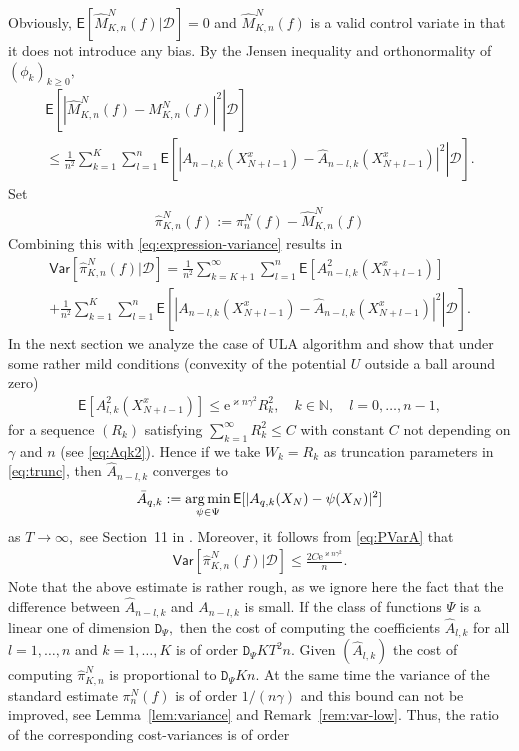 \documentclass[bj]{imsart}
\def\PE{\mathsf{E}}
\def\PVar{\mathsf{Var}}
\def\nset{\mathbb{N}}
\def\rme{\mathrm{e}}
\def\TrainSet{\mathcal{D}}
\newcommand*{\argmin}{\operatornamewithlimits{arg\,min}}
\begin{document}
Obviously, \(\mathsf{E}[\widehat M_{K,n}^N(f)|\TrainSet]=0\) and \(\widehat M_{K,n}^N(f)\) is a valid control variate in that it
does not introduce any bias. By the Jensen inequality and orthonormality of \((\phi_k)_{k\geq 0},\)
\begin{multline*}
\mathsf{E}\left[\left.\left|\widehat{M}_{K,n}^{N}(f)-M_{K,n}^{N}(f)\right|^{2}\right | \TrainSet \right]
\\
\leq \frac{1}{n^2}\sum_{k=1}^{K}\sum_{l=1}^{n}\PE\left[\left.|A_{n-l,k}(X^x_{N+l-1})-\widehat A_{n-l,k}(X^x_{N+l-1})|^2\right | \TrainSet \right].
\end{multline*}
Set
\begin{eqnarray*}
\widehat\pi_{K,n}^N(f):=\pi_n^N(f)-\widehat{M}_{K,n}^N(f)
\end{eqnarray*}
Combining this with \eqref{eq:expression-variance} results in
\begin{multline}
\label{eq:PVarA}
\PVar[\widehat \pi_{K,n}^N(f)|\TrainSet]=\frac{1}{n^2}\sum_{k=K+1}^{\infty}\sum_{l=1}^{n}\PE[A^2_{n-l,k}(X^x_{N+l-1})]
\\
+\frac{1}{n^2}\sum_{k=1}^{K}\sum_{l=1}^{n}\PE\left[\left.|A_{n-l,k}(X^x_{N+l-1})-\widehat A_{n-l,k}(X^x_{N+l-1})|^2\right | \TrainSet \right].
\end{multline}
In the next section we analyze the case of ULA algorithm and show that under some rather mild conditions (convexity of the potential $U$ outside a ball around zero)
\begin{eqnarray*}
\PE[A^2_{l,k}(X^x_{N+l-1})]\leq \rme^{\varkappa n\gamma^2}R^2_k ,\quad k \in \nset, \quad l=0,\ldots,n-1,
\end{eqnarray*}
for a sequence  $(R_k)$ satisfying $\sum_{k=1}^\infty R^2_k\leq C$ with constant $C$  not depending  on $\gamma$ and $n$ (see \eqref{eq:Aqk2}).  Hence if we take $W_k=R_k$ as truncation parameters in \eqref{eq:trunc}, then $\widehat A_{n-l,k}$ converges to
\[
\bar A_{q,k}:=\argmin_{\psi\in\Psi}\mathsf{E}[|A_{q,k}(X_{N})-\psi(X_{N})|^2]
\]
 as $T\to \infty,$ see Section~11 in \cite{gyorfi2006distribution}.  Moreover, it follows from \eqref{eq:PVarA} that
\begin{eqnarray*}
\PVar[\widehat \pi_{K,n}^N(f)|\TrainSet]\leq \frac{2C \rme^{\varkappa n\gamma^2}}{n}.
\end{eqnarray*}
 Note that the above estimate is rather rough, as we ignore here the fact that the difference between $\widehat A_{n-l,k}$ and $A_{n-l,k}$ is small.
If the class of functions $\Psi$ is a linear one of dimension $\mathtt{D}_\Psi,$ then the cost of computing the coefficients $\widehat A_{l,k}$ for all $l=1,\ldots,n$ and $k=1,\ldots,K$ is of order  $ \mathtt{D}_\Psi K T^2 n$. Given $(\widehat A_{l,k})$ the cost of computing  $\widehat \pi_{K,n}^N$ is proportional to $\mathtt{D}_\Psi K n.$ At the same time the variance of the standard estimate $ \pi_{n}^N(f)$ is of order $1/(n\gamma)$ and this bound can not be improved, see Lemma~\ref{lem:variance} and Remark~\ref{rem:var-low}. Thus, the ratio of the corresponding cost-variances is of order
\end{document}
